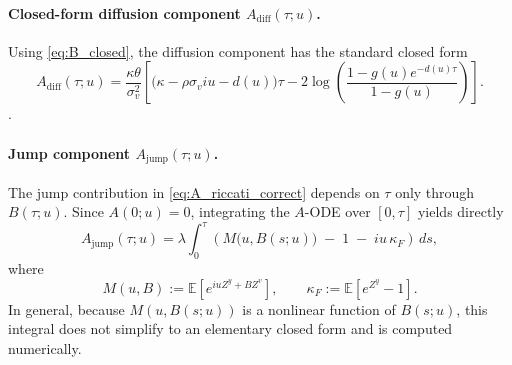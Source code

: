 \documentclass[a4paper,titlepage,12pt]{report}
\theoremstyle{plain}
\begin{document}
\paragraph{Closed-form diffusion component $A_{\mathrm{diff}}(\tau;u)$.}
Using \eqref{eq:B_closed},
the diffusion component has the standard closed form \citep{Heston1993}
\begin{equation}
A_{\mathrm{diff}}(\tau;u)
=
\frac{\kappa\theta}{\sigma_v^2}
\left[
\big(\kappa-\rho\sigma_v i u - d(u)\big)\tau
-
2\log\!\left(\frac{1-g(u)e^{-d(u)\tau}}{1-g(u)}\right)
\right].
\label{eq:A_diff_closed}
\end{equation}.

\paragraph{Jump component $A_{\mathrm{jump}}(\tau;u)$.}
The jump contribution in \eqref{eq:A_riccati_correct} depends on $\tau$ only through $B(\tau;u)$.
Since $A(0;u)=0$, integrating the $A$-ODE over $[0,\tau]$ yields directly
\begin{equation}
A_{\mathrm{jump}}(\tau;u)
=
\lambda\int_{0}^{\tau}
\left(
M\!\big(u,B(s;u)\big)\;-\;1\;-\; i u\,\kappa_F
\right)\,ds,
\label{eq:A_jump_integral}
\end{equation}
where
\[
M(u,B):=\mathbb{E}\!\left[e^{iuZ^y + BZ^v}\right],
\qquad
\kappa_F:=\mathbb{E}\!\left[e^{Z^y}-1\right].
\]
In general, because $M(u,B(s;u))$ is a nonlinear function of $B(s;u)$, this integral does not simplify to an elementary closed form and is
computed numerically.
\end{document}
